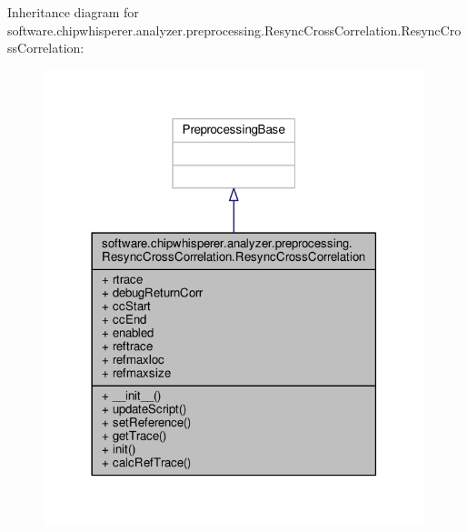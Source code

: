 Inheritance diagram for software.\+chipwhisperer.\+analyzer.\+preprocessing.\+Resync\+Cross\+Correlation.\+Resync\+Cross\+Correlation\+:\nopagebreak
\begin{figure}[H]
\begin{center}
\leavevmode
\includegraphics[width=314pt]{d0/d20/classsoftware_1_1chipwhisperer_1_1analyzer_1_1preprocessing_1_1ResyncCrossCorrelation_1_1ResyncCrossCorrelation__inherit__graph}
\end{center}
\end{figure}


